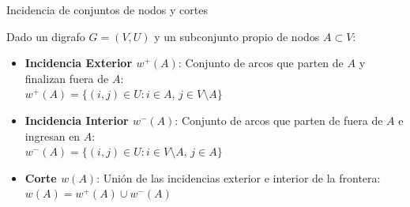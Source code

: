 \documentclass[
  ignorenonframetext,
]{beamer}
\begin{document}
\begin{frame}{Incidencia de conjuntos de nodos y cortes}
\label{incidencia-de-conjuntos-de-nodos-y-cortes}
\begin{tcolorbox}[enhanced jigsaw, left=2mm, opacityback=0, titlerule=0mm, breakable, toptitle=1mm, rightrule=.15mm, bottomtitle=1mm, coltitle=black, title=\textcolor{quarto-callout-note-color}{\faInfo}\hspace{0.5em}{Definición: Incidencia y corte de un conjunto A}, colframe=quarto-callout-note-color-frame, colbacktitle=quarto-callout-note-color!10!white, arc=.35mm, toprule=.15mm, leftrule=.75mm, bottomrule=.15mm, opacitybacktitle=0.6, colback=white]

Dado un digrafo \(G = (V, U)\) y un subconjunto propio de nodos
\(A \subset V\):

\begin{itemize}
\item
  \textbf{Incidencia Exterior \(w^+(A)\)}: Conjunto de arcos que parten
  de \(A\) y finalizan fuera de \(A\):\\
  \(w^+(A) = \{(i, j) \in U : i \in A, \, j \in V \setminus A\}\)
\item
  \textbf{Incidencia Interior \(w^-(A)\)}: Conjunto de arcos que parten
  de fuera de \(A\) e ingresan en \(A\):\\
  \(w^-(A) = \{(i, j) \in U : i \in V \setminus A, \, j \in A\}\)
\item
  \textbf{Corte \(w(A)\)}: Unión de las incidencias exterior e interior
  de la frontera:\\
  \(w(A) = w^+(A) \cup w^-(A)\)
\end{itemize}

\end{tcolorbox}
\end{frame}
\end{document}
